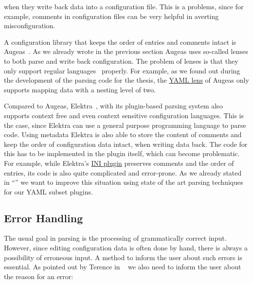 when they write back data into a configuration file. This is a problems, since for example, comments in configuration files can be very helpful in averting misconfiguration.

A configuration library that keeps the order of entries and comments intact is Augeas~\cite{lutterkort2008augeas, berlakovich2016universal}. As we already wrote in the previous section Augeas uses so-called lenses to both parse and write back configuration. The problem of lenses is that they only support regular languages~\cite{chomsky1959certain} properly. For example, as we found out during the development of the parsing code for the thesis, the \href{https://github.com/hercules-team/augeas/blob/d555a995a06ac81cab62d016d6eaff8a7ba64a2e/lenses/yaml.aug}{YAML lens} of Augeas only supports mapping data with a nesting level of two.

Compared to Augeas, Elektra~\cite{raab2010modular, raab2017context}, with its plugin-based parsing system also supports context free and even context sensitive configuration languages. This is the case, since Elektra can use a general purpose programming language to parse code. Using metadata Elektra is also able to store the content of comments and keep the order of configuration data intact, when writing data back. The code for this has to be implemented in the plugin itself, which can become problematic. For example, while Elektra’s \href{https://github.com/ElektraInitiative/libelektra/tree/3e6e0254a54d3ad9642091550ce9c560d8cf38dd/src/plugins/ini}{INI plugin} preserves comments and the order of entries, its code is also quite complicated and error-prone. As we already stated in “” we want to improve this situation using state of the art parsing techniques for our YAML subset plugins.

\subsection{Error Handling}
\label{sec:error_handling}

The usual goal in parsing is the processing of grammatically correct input. However, since editing configuration data is often done by hand, there is always a possibility of erroneous input. A method to inform the user about such errors is essential. As pointed out by Terence \citeauthor{parr2013definitive} in ~\cite[p. 151]{parr2013definitive} we also need to inform the user about the reason for an error:

